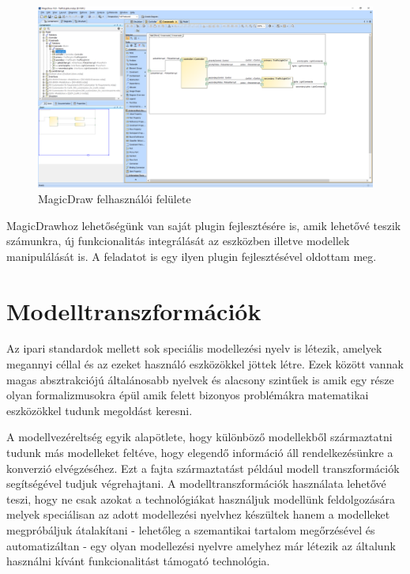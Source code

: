 \begin{figure}[!ht]
	\centering
	\includegraphics[width=140mm, keepaspectratio]{figures/preliminaries/md-gui.png}
	\caption{MagicDraw felhasználói felülete}
	\label{fig:md-gui}
\end{figure}

MagicDrawhoz lehetőségünk van saját plugin fejlesztésére is, amik lehetővé teszik számunkra, új funkcionalitás integrálását az eszközben illetve modellek manipulálását is. A feladatot is egy ilyen plugin fejlesztésével oldottam meg.


\section{Modelltranszformációk}

Az ipari standardok mellett sok speciális modellezési nyelv is létezik, amelyek megannyi céllal és az ezeket használó eszközökkel jöttek létre. Ezek között vannak magas absztrakciójú általánosabb nyelvek és alacsony szintűek is amik egy része olyan formalizmusokra épül amik felett bizonyos problémákra matematikai eszközökkel tudunk megoldást keresni.

A modellvezéreltség egyik alapötlete, hogy különböző modellekből származtatni tudunk más modelleket feltéve, hogy elegendő információ áll rendelkezésünkre a konverzió elvégzéséhez. Ezt a fajta származtatást például modell transzformációk segítségével tudjuk végrehajtani. A modelltranszformációk használata lehetővé teszi, hogy ne csak azokat a technológiákat használjuk modellünk feldolgozására melyek speciálisan az adott modellezési nyelvhez készültek hanem a modelleket megpróbáljuk átalakítani - lehetőleg a szemantikai tartalom megőrzésével és automatizáltan - egy olyan modellezési nyelvre amelyhez már létezik az általunk használni kívánt funkcionalitást támogató technológia.

